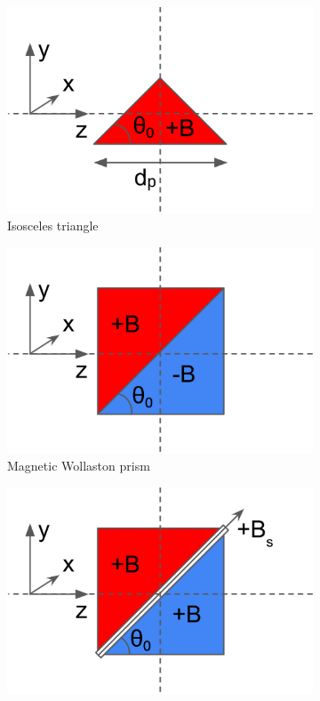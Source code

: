 \documentclass{article}
\begin{document}
\begin{figure}[htbp]
	\centering
	\begin{subfigure}[b]{0.3\textwidth}
		\centering
		\includegraphics[width=\textwidth]{iso-schematic}
		\caption{Isosceles triangle}
		\label{fig:precession-devices:iso}
	\end{subfigure}
	\hfill
	\begin{subfigure}[b]{0.3\textwidth}
		\centering
		\includegraphics[width=\textwidth]{wp-schematic}
		\caption{Magnetic Wollaston prism}
		\label{fig:precession-devices:wsp}
	\end{subfigure}
	\hfill
	\begin{subfigure}[b]{0.3\textwidth}
		\centering
		\includegraphics[width=\textwidth]{foil-schematic}

\end{subfigure}
\end{figure}
\end{document}
